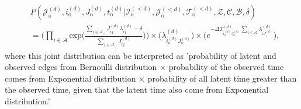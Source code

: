 \documentclass[a4paper]{article}
\begin{document}
\begin{equation}
\begin{aligned}
&P(\mathcal{J}^{(d)}_{\mbox{a}}, i^{(d)}_{\mbox{o}}, J^{(d)}_{\mbox{o}}, t^{(d)}_{\mbox{o}} |\mathcal{I}^{(<d)}_{\mbox{o}}, \mathcal{J}^{(<d)}_{\mbox{o}}, \mathcal{T}^{(<d)}_{\mbox{o}}, \mathcal{Z}, \mathcal{C}, \mathcal{B}, \delta)\\&=\Big(\prod_{i\in \mathcal{A}}\mbox{exp}\Big(\frac{\sum_{j \in \mathcal{A}_{\backslash i}}J^{(d)}_{ij}\lambda^{(d)}_{ij} - \delta}{\sum\limits_{j \in \mathcal{A}_{\backslash i}}J^{(d)}_{ij}}\Big)\Big)\times \Big(\lambda^{(d)}_{i_o^{(d)}J_{o}^{(d)}}\Big)\times  \Big(e^{-\Delta T^{(d)}_{i_o^{(d)}J_o^{(d)}}\sum\limits_{i\in \mathcal{A}}\lambda^{(d)}_{iJ^{(d)}_{i}}}\Big),
\end{aligned}
\end{equation}
where this joint distribution can be interpreted as 'probability of latent and observed edges from Bernoulli distribution $\times$ probability of the observed time comes from Exponential distribution $\times$ probability of all latent time greater than the observed time, given that the latent time also come from Exponential distribution.'
\end{document}
